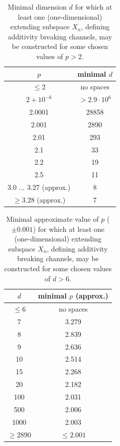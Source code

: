 \documentclass[reqno]{amsart}
\theoremstyle{plain}
\theoremstyle{note}
\begin{document}
\begin{table}[ht]
    \caption{Minimal dimension $d$ for which at least one (one-dimensional) extending subspace $X_n$, defining additivity breaking channels, may be constructed for some chosen values of $p > 2$.}
    \label{tab:MinimalD_Bell}
    \centering
    \begin{tabular}{|c|c|}\hline
        $p$           & minimal $d$ \\ \hline
        $\leqslant 2$ & no spaces   \\
        $2 + 10^{-6}$ & $>2.9 \cdot 10^6$ \\
        2.0001          & 28858        \\
        2.001          & 2890      \\
        2.01          & 293      \\
        2.1           & 33         \\
        2.2           & 19      \\
        2.5           & 11      \\
        3.0 ... 3.27 (approx.)  & 8 \\
        $\geqslant 3.28$ (approx.)  & 7 \\ \hline
    \end{tabular}
\end{table}

\begin{table}[ht]
    \caption{Minimal approximate value of $p$ ($\pm 0.001$) for which at least one (one-dimensional) extending subspace $X_n$, defining additivity breaking channels, may be constructed for some chosen values of $d > 6$.}
    \label{tab:MinimalP_Bell}
    \centering
    \begin{tabular}{|c|c|}\hline
        $d$           & minimal $p$ (approx.) \\ \hline
        $\leqslant 6$ & no spaces   \\
        7             & 3.279 \\
        8             & 2.839 \\
        9             & 2.636 \\
        10            & 2.514 \\
        15            & 2.268 \\
        20            & 2.182 \\
        100           & 2.031 \\
        500        & 2.006 \\
        1000       & 2.003 \\
        $\geqslant 2890$ & $\leqslant 2.001$ \\ \hline
    \end{tabular}
\end{table}
\end{document}
